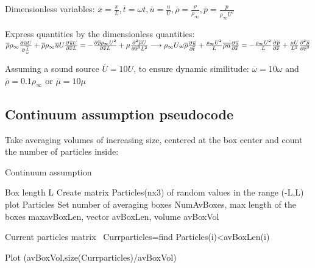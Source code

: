 \vspace{1mm}

Dimensionless variables:
$\overline{x}=\frac{x}{L},\overline{t}=\omega t, \overline{u}=\frac{u}{U}, \overline{\rho}=\frac{\rho}{\rho_{\infty}},\overline{p}=\frac{p}{\rho_{\infty} U^2}$

\vspace{1mm}

Express quantities by the dimensionless quantities:
  $ \overline{\rho}\rho_{\infty}\pdv[]{\overline{u} U}{\frac{\overline{t}}\omega{}} + \overline{\rho}\rho_{\infty}\overline{u} U\pdv[]{\overline{u} U}{\overline{x} L} = -\pdv[]{\overline{p}\rho_{\infty} U^2}{\overline{x} L} + \mu\pdv[2]{\overline{\mu} U}{\overline{x}^2 L}   \vspace{1mm} \longrightarrow   \rho_{\infty} U\omega\overline{\rho}\pdv[]{\overline{u}}{\overline{t}} +  \frac{\rho_{\infty} U^2}{L} \overline{\rho}\overline{u}\pdv[]{\overline{u}}{\overline{x}} = -\frac{\rho_{\infty} U^2}{L}\pdv[]{\overline{p}}{\overline{x} } + \frac{\mu U}{L^2}\pdv[2]{\overline{\mu}}{\overline{x}}$
\vspace{1mm}

Assuming a sound source $\overline{U}=10U$, to ensure dynamic similitude: $\overline{\omega}=10\omega$ and $\overline{\rho}=0.1\rho_{\infty}$ or $\overline{\mu}=10\mu$

\subsection{Continuum assumption pseudocode}
Take averaging volumes of increasing size, centered at the box center and count the number of particles inside:

\begin{algorithm}[H]
			
    \caption*{Continuum assumption}
    \begin{algorithmic}
			\State Box length L
			\State Create matrix Particles(nx3) of random values in 				the range (-L,L)
			\State plot Particles
			\State Set number of averaging boxes NumAvBoxes, max length of the boxes maxavBoxLen, vector avBoxLen, volume avBoxVol
                
                    \State  Current particles matrix \										Currparticles=find Particles(i)\textless 								avBoxLen(i)
                                           
            \EndFor
            \State Plot (avBoxVol,size(Currparticles)/avBoxVol)
				
    \end{algorithmic}
			
\end{algorithm}





